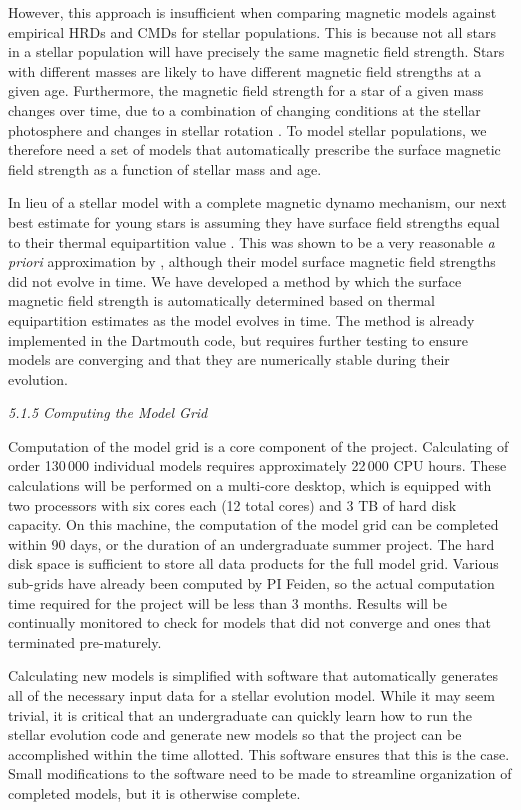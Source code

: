 However, this approach is insufficient when comparing magnetic models against empirical HRDs and CMDs for stellar populations. This is because not all stars in a stellar population will have precisely the same magnetic field strength. Stars with different masses are likely to have different magnetic field strengths at a given age. Furthermore, the magnetic field strength for a star of a given mass changes over time, due to a combination of changing conditions at the stellar photosphere \citep[see, e.g.,][]{Feiden2016} and changes in stellar rotation \citep[e.g.,][]{Skumanich1972}. To model stellar populations, we therefore need a set of models that automatically prescribe the surface magnetic field strength as a function of stellar mass and age. 

In lieu of a stellar model with a complete magnetic dynamo mechanism, our next best estimate for young stars is assuming they have surface field strengths equal to their thermal equipartition value \citep{JohnsKrull1999}. This was shown to be a very reasonable {\it a priori} approximation by \citet{Feiden2016}, although their model surface magnetic field strengths did not evolve in time. We have developed a method by which the surface magnetic field strength is automatically determined based on thermal equipartition estimates as the model evolves in time. The method is already implemented in the Dartmouth code, but requires further testing to ensure models are converging and that they are numerically stable during their evolution. 

{\it 5.1.5 Computing the Model Grid}

Computation of the model grid is a core component of the project. Calculating of order 130\,000 individual models requires approximately 22\,000 CPU hours. These calculations will be performed on a multi-core desktop, which is equipped with two processors with six cores each (12 total cores) and 3 TB of hard disk capacity. On this machine, the computation of the model grid can be completed within 90 days, or the duration of an undergraduate summer project. The hard disk space is sufficient to store all data products for the full model grid. Various sub-grids have already been computed by PI Feiden, so the actual computation time required for the project will be less than 3 months. Results will be continually monitored to check for models that did not converge and ones that terminated pre-maturely.

Calculating new models is simplified with software that automatically generates all of the necessary input data for a stellar evolution model. While it may seem trivial, it is critical that an undergraduate can quickly learn how to run the stellar evolution code and generate new models so that the project can be accomplished within the time allotted. This software ensures that this is the case. Small modifications to the software need to be made to streamline organization of completed models, but it is otherwise complete.


